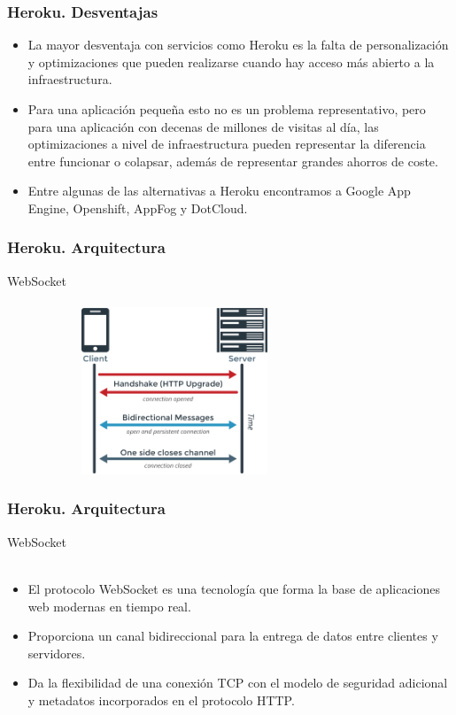 \documentclass{beamer}
\begin{document}
\begin{frame}
\frametitle{Heroku. Desventajas}
\begin{itemize}
	\item La mayor desventaja con servicios como Heroku es la falta de personalización y optimizaciones que pueden realizarse cuando hay acceso más abierto a la infraestructura.
	\item Para una aplicación pequeña esto no es un problema representativo, pero para una aplicación con decenas de millones de visitas al día, las optimizaciones a nivel de infraestructura pueden representar la diferencia entre funcionar o colapsar, además de representar grandes ahorros de coste.
	\item Entre algunas de las alternativas a Heroku encontramos a Google App Engine, Openshift, AppFog y DotCloud.
\end{itemize}
\end{frame}

\begin{frame}
\frametitle{Heroku. Arquitectura}
\centering WebSocket\\ \ \\
\includegraphics[width=10cm,height=5cm]{arquitectura/1.png}

\end{frame}

\begin{frame}
	\frametitle{Heroku. Arquitectura}
	\centering WebSocket\\ \ \\
	\begin{itemize}
		\item El protocolo WebSocket es una tecnología que forma la base de aplicaciones web modernas en tiempo real.
		\item Proporciona un canal bidireccional para la entrega de datos entre clientes y servidores.
		\item Da la flexibilidad de una conexión TCP con el modelo de seguridad adicional y metadatos incorporados en el protocolo HTTP.
	\end{itemize}
\end{frame}
\end{document}
